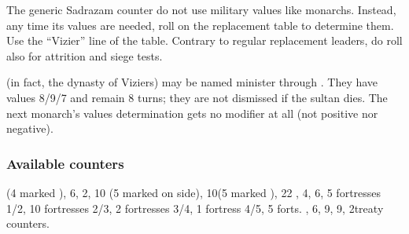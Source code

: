 \aparag[] [BLP] The generic Sadrazam counter do not use military
values like monarchs.
\bparag Instead, any time its values are needed, roll on the
replacement table to determine them. Use the ``Vizier'' line of the
table.
\bparag Contrary to regular replacement leaders, do roll also for
attrition and siege tests.

 (in fact, the dynasty of Viziers) may
be named minister through . They have values
8/9/7 and remain 8 turns; they are not dismissed if the sultan dies. The
next monarch's values determination gets no modifier at all (not
positive nor negative).

\subsubsection{Available counters}
\ARMY (4 marked \Timar), 6\FLEET, 2\corsaire, 10\LDND
(5 marked \Timar on \LD side), 10\LD (5 marked \Timar), 22 \Pashas, 4\NTD,
6\LDENDE, 5 fortresses 1/2, 10 fortresses 2/3, 2 fortresses 3/4, 1
fortress 4/5, 5 forts.
\COL, 6\TP, 9\MNU, 9\TradeFLEET, 2\ROTW treaty
counters.



